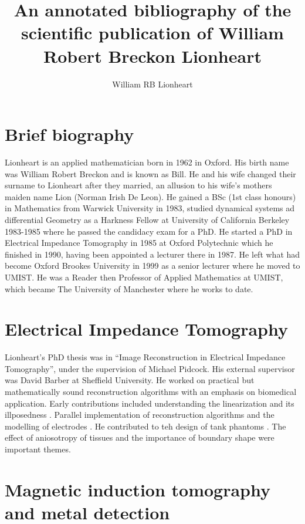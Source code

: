 \documentclass[]{article}
\title{An annotated bibliography of the  scientific publication of William Robert Breckon Lionheart}
\author{William RB Lionheart}
\begin{document}
\maketitle


\section{Brief biography}
Lionheart is an applied mathematician born in 1962 in Oxford. His birth name was William Robert Breckon and is known as Bill. He and his wife changed their surname to Lionheart after they married, an allusion to his wife's mothers maiden name Lion (Norman Irish De Leon).  He gained a BSc (1st class honours) in Mathematics from Warwick University in 1983, studied dynamical systems ad differential Geometry as a Harkness Fellow at University of California Berkeley 1983-1985 where he passed the candidacy exam for a PhD. He started a PhD in Electrical Impedance Tomography in 1985 at Oxford Polytechnic which he finished in 1990, having been appointed a lecturer there in 1987.  He left what had become Oxford Brookes University in 1999 as a senior lecturer where he moved to UMIST. He was a Reader then Professor of Applied Mathematics at UMIST, which became The University of Manchester where he works to date.

\section{Electrical Impedance Tomography}

Lionheart's PhD thesis was in ``Image Reconstruction in Electrical Impedance Tomography''\cite{breckon1990image}, under the supervision of Michael Pidcock. His external supervisor was David Barber at Sheffield University. He worked on practical but mathematically sound reconstruction algorithms with an emphasis on biomedical application. Early contributions included understanding the linearization and its illposedness \cite{breckon1988ill} \cite{breckon1988progress} \cite{breckon1988data}. Parallel implementation of reconstruction algorithms \cite{breckon1990parallelism} and the modelling of electrodes \cite{paulson1992electrode}. He contributed to teh design of tank phantoms \cite{paulson1992hybrid}. The effect of  aniosotropy of tissues \cite{breckon1992problem}  and the importance of boundary shape were important themes. 


\section{Magnetic induction tomography and metal detection}
\end{document}
